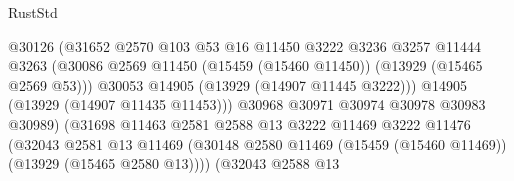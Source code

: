 \begin{lexlean}{RustStd}
\begin{coremodule}
                                            @30126
                                            (@31652
                                              @2570
                                              @103
                                              @53
                                              @16
                                              @11450
                                              @3222
                                              @3236
                                              @3257
                                              @11444
                                              @3263
                                              (@30086
                                                @2569
                                                @11450
                                                (@15459 (@15460 @11450))
                                                (@13929 (@15465 @2569 @53)))
                                              @30053
                                              @14905
                                              (@13929 (@14907 @11445 @3222)))
                                            @14905
                                            (@13929 (@14907 @11435 @11453)))
                                          @30968
                                          @30971
                                          @30974
                                          @30978
                                          @30983
                                          @30989)
                                        (@31698
                                          @11463
                                          @2581
                                          @2588
                                          @13
                                          @3222
                                          @11469
                                          @3222
                                          @11476
                                          (@32043
                                            @2581
                                            @13
                                            @11469
                                            (@30148
                                              @2580
                                              @11469
                                              (@15459 (@15460 @11469))
                                              (@13929 (@15465 @2580 @13))))
                                          (@32043
                                            @2588
                                            @13

\end{coremodule}
\end{lexlean}
